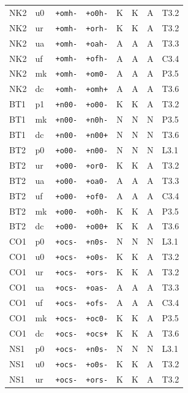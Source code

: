 {\begin{longtable}{@{}llllcccl@{}}
NK2 & u0 & \texttt{+omh-} & \texttt{+o0h-} & K & K & A & T3.2 \\
NK2 & ur & \texttt{+omh-} & \texttt{+orh-} & K & K & A & T3.2 \\
NK2 & ua & \texttt{+omh-} & \texttt{+oah-} & A & A & A & T3.3 \\
NK2 & uf & \texttt{+omh-} & \texttt{+ofh-} & A & A & A & C3.4 \\
NK2 & mk & \texttt{+omh-} & \texttt{+om0-} & A & A & A & P3.5 \\
NK2 & dc & \texttt{+omh-} & \texttt{+omh+} & A & A & A & T3.6 \\
BT1 & p1 & \texttt{+n00-} & \texttt{+o00-} & K & K & A & T3.2 \\
BT1 & mk & \texttt{+n00-} & \texttt{+n0h-} & N & N & N & P3.5 \\
BT1 & dc & \texttt{+n00-} & \texttt{+n00+} & N & N & N & T3.6 \\
BT2 & p0 & \texttt{+o00-} & \texttt{+n00-} & N & N & N & L3.1 \\
BT2 & ur & \texttt{+o00-} & \texttt{+or0-} & K & K & A & T3.2 \\
BT2 & ua & \texttt{+o00-} & \texttt{+oa0-} & A & A & A & T3.3 \\
BT2 & uf & \texttt{+o00-} & \texttt{+of0-} & A & A & A & C3.4 \\
BT2 & mk & \texttt{+o00-} & \texttt{+o0h-} & K & K & A & P3.5 \\
BT2 & dc & \texttt{+o00-} & \texttt{+o00+} & K & K & A & T3.6 \\
CO1 & p0 & \texttt{+ocs-} & \texttt{+n0s-} & N & N & N & L3.1 \\
CO1 & u0 & \texttt{+ocs-} & \texttt{+o0s-} & K & K & A & T3.2 \\
CO1 & ur & \texttt{+ocs-} & \texttt{+ors-} & K & K & A & T3.2 \\
CO1 & ua & \texttt{+ocs-} & \texttt{+oas-} & A & A & A & T3.3 \\
CO1 & uf & \texttt{+ocs-} & \texttt{+ofs-} & A & A & A & C3.4 \\
CO1 & mk & \texttt{+ocs-} & \texttt{+oc0-} & K & K & A & P3.5 \\
CO1 & dc & \texttt{+ocs-} & \texttt{+ocs+} & K & K & A & T3.6 \\
NS1 & p0 & \texttt{+ocs-} & \texttt{+n0s-} & N & N & N & L3.1 \\
NS1 & u0 & \texttt{+ocs-} & \texttt{+o0s-} & K & K & A & T3.2 \\
NS1 & ur & \texttt{+ocs-} & \texttt{+ors-} & K & K & A & T3.2 \\

\end{longtable}}
